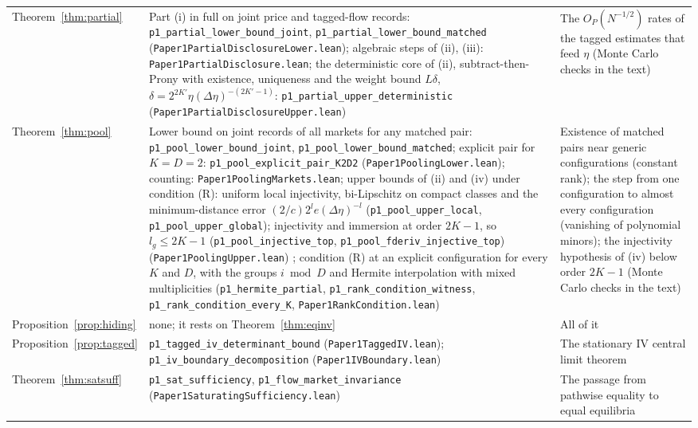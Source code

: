 \documentclass[12pt]{article}
\theoremstyle{definition}
\theoremstyle{remark}
\begin{document}
\begin{longtable}{>{\raggedright\arraybackslash}p{}>{\raggedright\arraybackslash}p{}>{\raggedright\arraybackslash}p{}}
Theorem~\ref{thm:partial} & Part (i) in full on joint price and tagged-flow records: \texttt{p1\_partial\_lower\_bound\_joint}, \texttt{p1\_partial\_lower\_bound\_matched} (\nolinkurl{Paper1PartialDisclosureLower.lean}); algebraic steps of (ii), (iii): \nolinkurl{Paper1PartialDisclosure.lean}; the deterministic core of (ii), subtract-then-Prony with existence, uniqueness and the weight bound $L\delta$, $\delta=2^{2K'}\eta(\Delta\eta)^{-(2K'-1)}$: \texttt{p1\_partial\_upper\_deterministic} (\nolinkurl{Paper1PartialDisclosureUpper.lean}) & The $O_P(N^{-1/2})$ rates of the tagged estimates that feed $\eta$ (Monte Carlo checks in the text)\\
Theorem~\ref{thm:pool} & Lower bound on joint records of all markets for any matched pair: \texttt{p1\_pool\_lower\_bound\_joint}, \texttt{p1\_pool\_lower\_bound\_matched}; explicit pair for $K=D=2$: \texttt{p1\_pool\_explicit\_pair\_K2D2} (\nolinkurl{Paper1PoolingLower.lean}); counting: \nolinkurl{Paper1PoolingMarkets.lean}; upper bounds of (ii) and (iv) under condition (R): uniform local injectivity, bi-Lipschitz on compact classes and the minimum-distance error $(2/c)2^l e(\Delta\eta)^{-l}$ (\texttt{p1\_pool\_upper\_local}, \texttt{p1\_pool\_upper\_global}); injectivity and immersion at order $2K-1$, so $l_g\le2K-1$ (\texttt{p1\_pool\_injective\_top}, \texttt{p1\_pool\_fderiv\_injective\_top}) (\nolinkurl{Paper1PoolingUpper.lean}) ; condition (R) at an explicit configuration for every $K$ and $D$, with the groups $i\bmod D$ and Hermite interpolation with mixed multiplicities (\texttt{p1\_hermite\_partial}, \texttt{p1\_rank\_condition\_witness}, \texttt{p1\_rank\_condition\_every\_K}, \nolinkurl{Paper1RankCondition.lean}) & Existence of matched pairs near generic configurations (constant rank); the step from one configuration to almost every configuration (vanishing of polynomial minors); the injectivity hypothesis of (iv) below order $2K-1$ (Monte Carlo checks in the text)\\
Proposition~\ref{prop:hiding} & none; it rests on Theorem~\ref{thm:eqinv} & All of it\\
Proposition~\ref{prop:tagged} & \texttt{p1\_tagged\_iv\_determinant\_bound} (\nolinkurl{Paper1TaggedIV.lean}); \texttt{p1\_iv\_boundary\_decomposition} (\nolinkurl{Paper1IVBoundary.lean}) & The stationary IV central limit theorem\\
Theorem~\ref{thm:satsuff} & \texttt{p1\_sat\_sufficiency}, \texttt{p1\_flow\_market\_invariance} (\nolinkurl{Paper1SaturatingSufficiency.lean}) & The passage from pathwise equality to equal equilibria\\

\end{longtable}
\end{document}
